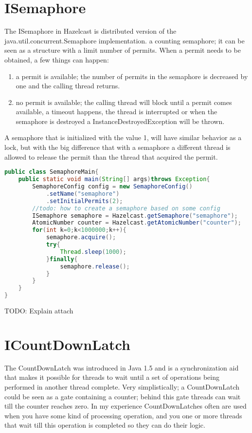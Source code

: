 \section{ISemaphore}

The ISemaphore in Hazelcast is distributed version of the java.util.concurrent.Semaphore implementation. a counting semaphore; it can be seen as a structure with a limit number of permits. When a permit needs to be obtained, a few things can happen:
\begin{enumerate}
\item a permit is available; the number of permits in the semaphore is decreased by one and the calling thread returns.
\item no permit is available; the calling thread will block until a permit comes available, a timeout happens, the thread is interrupted or when the semaphore is destroyed a InstanceDestroyedException will be thrown.
\end{enumerate}

A semaphore that is initialized with the value 1, will have similar behavior as a lock, but with the big difference that with a semaphore a different thread is allowed to release the permit than the thread that acquired the permit.

\begin{lstlisting}[language=java]
public class SemaphoreMain{
    public static void main(String[] args)throws Exception{
        SemaphoreConfig config = new SemaphoreConfig()
            .setName("semaphore")
            .setInitialPermits(2);
        //todo: how to create a semaphore based on some config
        ISemaphore semaphore = Hazelcast.getSemaphore("semaphore");
        AtomicNumber counter = Hazelcast.getAtomicNumber("counter");
        for(int k=0;k<1000000;k++){
            semaphore.acquire();
            try{
                Thread.sleep(1000);
            }finally{
                semaphore.release();
            }
        }
    }
}
\end{lstlisting}

TODO: Explain attach

\section{ICountDownLatch}
The CountDownLatch was introduced in Java 1.5 and is a synchronization aid that makes it possible for threads to wait until a set of operations being performed in another thread  complete. Very simplistically; a CountDownLatch could be seen as a gate containing a counter; behind this gate threads can wait till the counter reaches zero. In my experience CountDownLatches often are used when you have some kind of processing operation, and you one or more threads that wait till this operation is completed so they can do their logic.

